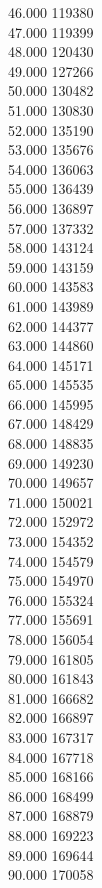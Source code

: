 { 46.000	119380 \\
 47.000	119399 \\
 48.000	120430 \\
 49.000	127266 \\
 50.000	130482 \\
 51.000	130830 \\
 52.000	135190 \\
 53.000	135676 \\
 54.000	136063 \\
 55.000	136439 \\
 56.000	136897 \\
 57.000	137332 \\
 58.000	143124 \\
 59.000	143159 \\
 60.000	143583 \\
 61.000	143989 \\
 62.000	144377 \\
 63.000	144860 \\
 64.000	145171 \\
 65.000	145535 \\
 66.000	145995 \\
 67.000	148429 \\
 68.000	148835 \\
 69.000	149230 \\
 70.000	149657 \\
 71.000	150021 \\
 72.000	152972 \\
 73.000	154352 \\
 74.000	154579 \\
 75.000	154970 \\
 76.000	155324 \\
 77.000	155691 \\
 78.000	156054 \\
 79.000	161805 \\
 80.000	161843 \\
 81.000	166682 \\
 82.000	166897 \\
 83.000	167317 \\
 84.000	167718 \\
 85.000	168166 \\
 86.000	168499 \\
 87.000	168879 \\
 88.000	169223 \\
 89.000	169644 \\
 90.000	170058 \\
}
